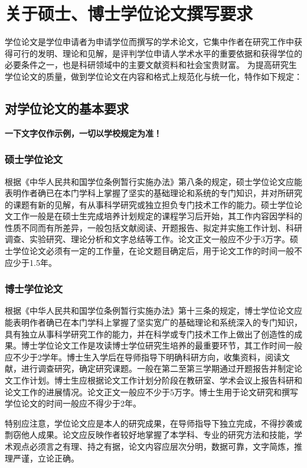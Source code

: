 \chapter{关于硕士、博士学位论文撰写要求}
\label{chap:requires}

学位论文是学位申请者为申请学位而撰写的学术论文，它集中作者在研究工作中获得可行的发明、理论和见解，是评判学位申请人学术水平的重要依据和获得学位的必要条件之一，也是科研领域中的主要文献资料和社会宝贵财富。
为提高研究生学位论文的质量，做到学位论文在内容和格式上规范化与统一化，特作如下规定：

\section{对学位论文的基本要求}

\textbf{一下文字仅作示例，一切以学校规定为准！}

\subsection{硕士学位论文}

根据《中华人民共和国学位条例暂行实施办法》第八条的规定，硕士学位论文应能表明作者确已在本门学科上掌握了坚实的基础理论和系统的专门知识，并对所研究的课题有新的见解，有从事科学研究或独立担负专门技术工作的能力。硕士学位论文工作一般是在硕士生完成培养计划规定的课程学习后开始，其工作内容因学科的性质不同而有所差异，一般包括文献阅读、开题报告、拟定并实施工作计划、科研调查、实验研究、理论分析和文字总结等工作。论文正文一般应不少于3万字。硕士学位论文必须有一定的工作量，在论文题目确定后，用于论文工作的时间一般不应少于1.5年。

\subsection{博士学位论文}

根据《中华人民共和国学位条例暂行实施办法》第十三条的规定，博士学位论文应能表明作者确已在本门学科上掌握了坚实宽广的基础理论和系统深入的专门知识，具有独立从事科学研究工作的能力，并在科学或专门技术工作上做出了创造性的成果。博士学位论文工作是攻读博士学位研究生培养的最重要环节，其工作时间一般应不少于2学年。博士生入学后在导师指导下明确科研方向，收集资料，阅读文献，进行调查研究，确定研究课题。一般在第二至第三学期通过开题报告并制定论文工作计划。博士生应根据论文工作计划分阶段在教研室、学术会议上报告科研和论文工作的进展情况。论文正文一般应不少于5万字。博士生用于论文研究和撰写学位论文的时间一般应不得少于2年。

特别应注意，学位论文应是本人的研究成果，在导师指导下独立完成，不得抄袭或剽窃他人成果。论文应反映作者较好地掌握了本学科、专业的研究方法和技能，学术观点必须言之有理、持之有据，论文内容应层次分明，数据可靠，文字简炼，推理严谨，立论正确。

